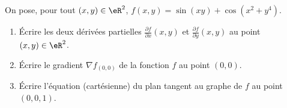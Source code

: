 

\begin{exercice}\label{exoOutilsMath-0086}

    On pose, pour tout \( (x,y)\in \eR^2\), \( f(x,y)=\sin(xy)+\cos(x^2+y^4)\).
    \begin{enumerate}
        \item
            Écrire les deux dérivées partielles \( \frac{ \partial f }{ \partial x }(x,y)\) et \( \frac{ \partial f }{ \partial y }(x,y)\) au point \( (x,y)\in \eR^2\).
        \item
            Écrire le gradient \( \nabla f_{(0,0)}\) de la fonction \( f\) au point \( (0,0)\).
        \item
            Écrire l'équation (cartésienne) du plan tangent au graphe de \( f\) au point \( (0,0,1)\).
    \end{enumerate}

\end{exercice}
